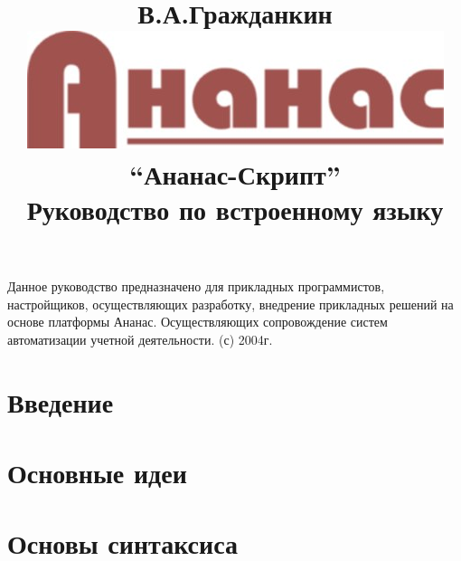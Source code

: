 \documentclass[11pt,russian,a4paper]{article}
\author{}
\title{В.А.Гражданкин\\
\includegraphics{ananas-text.jpg}\\
``Ананас-Скрипт''\\
Руководство по встроенному языку}
\begin{document}
\maketitle

\newcommand{\AS}{Ananas Script }
\newcommand{\A}{Ananas}
\newcommand{\Q}{script}
\newcommand{\QS}{script}

\newpage
\abstract

Данное руководство предназначено для прикладных программистов, настройщиков, осуществляющих разработку, внедрение
прикладных решений на основе платформы Ананас. Осуществляющих сопровождение систем автоматизации учетной деятельности.
\vfill{}
(с) 2004г.
\newpage
\tableofcontents
\newpage

\section{Введение}


\section{Основные идеи}


\section{Основы синтаксиса}
\end{document}
